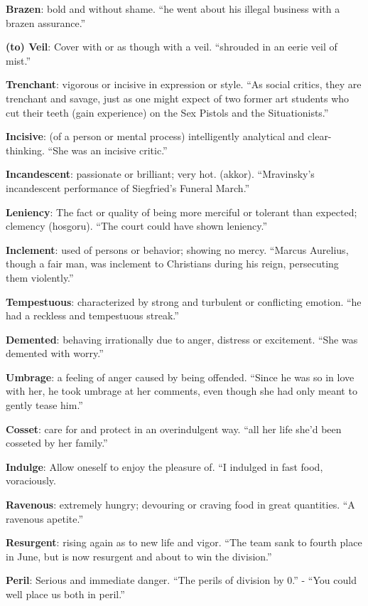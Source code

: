 \documentclass[12pt, a4paper]{ximera}
\begin{document}
\textbf{Brazen}: bold and without shame. ``he went about his illegal business with a brazen assurance.''

\textbf{(to) Veil}: Cover with or as though with a veil. ``shrouded in an eerie veil of mist.''

\textbf{Trenchant}: vigorous or incisive in expression or style. ``As social critics, they are trenchant and savage, just as one might expect of two former art students who cut their teeth (gain experience) on the Sex Pistols and the Situationists.''

\textbf{Incisive}: (of a person or mental process) intelligently analytical and clear-thinking. ``She was an incisive critic.''

\textbf{Incandescent}: passionate or brilliant; very hot. (akkor). ``Mravinsky's incandescent performance of Siegfried's Funeral March.''

\textbf{Leniency}: The fact or quality of being more merciful or tolerant than expected; clemency (hosgoru). ``The court could have shown leniency.''

\textbf{Inclement}: used of persons or behavior; showing no mercy. ``Marcus Aurelius, though a fair man, was inclement to Christians during his reign, persecuting them violently.''

\textbf{Tempestuous}: characterized by strong and turbulent or conflicting emotion. ``he had a reckless and tempestuous streak.''

\textbf{Demented}: behaving irrationally due to anger, distress or excitement. ``She was demented with worry.''

\textbf{Umbrage}: a feeling of anger caused by being offended. ``Since he was so in love with her, he took umbrage at her comments, even though she had only meant to gently tease him.''

\textbf{Cosset}: care for and protect in an overindulgent way. ``all her life she'd been cosseted by her family.''

\textbf{Indulge}: Allow oneself to enjoy the pleasure of. ``I indulged in fast food, voraciously.

\textbf{Ravenous}: extremely hungry; devouring or craving food in great quantities. ``A ravenous apetite.''

\textbf{Resurgent}: rising again as to new life and vigor. ``The team sank to fourth place in June, but is now resurgent and about to win the division.''

\textbf{Peril}: Serious and immediate danger. ``The perils of division by 0.'' - ``You could well place us both in peril.''
\end{document}

